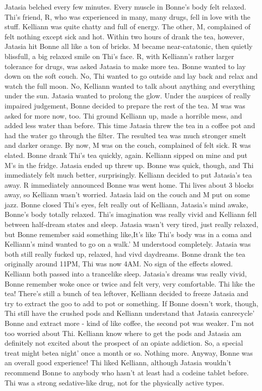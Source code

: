 \documentclass[12pt]{book}
\begin{document}
Jatasia belched every few minutes. Every muscle in Bonne's body felt relaxed. Thi's friend, R, who was experienced in many, many drugs, fell in love with the stuff. Kelliann was quite chatty and full of energy. The other, M, complained of felt nothing except sick and hot. Within two hours of drank the tea, however, Jatasia hit Bonne all like a ton of bricks. M became near-catatonic, then quietly blissfull, a big relaxed smile on Thi's face. R, with Kelliann's rather larger tolerance for drugs, was asked Jatasia to make more tea. Bonne wanted to lay down on the soft couch. No, Thi wanted to go outside and lay back and relax and watch the full moon. No, Kelliann wanted to talk about anything and everything under the sun. Jatasia wanted to prolong the glow. Under the auspices of really impaired judgement, Bonne decided to prepare the rest of the tea. M was was asked for more now, too. Thi ground Kelliann up, made a horrible mess, and added less water than before. This time Jatasia threw the tea in a coffee pot and had the water go through the filter. The resulted tea was much stronger smelt and darker orange. By now, M was on the couch, complained of felt sick. R was elated. Bonne drank Thi's tea quickly, again. Kelliann sipped on mine and put M's in the fridge. Jatasia ended up threw up. Bonne was quick, though, and Thi immediately felt much better, surprisingly. Kelliann decided to put Jatasia's tea away. R immediately announced Bonne was went home. Thi lives about 3 blocks away, so Kelliann wasn't worried. Jatasia laid on the couch and M put on some jazz. Bonne closed Thi's eyes, felt really out of Kelliann, Jatasia's mind awake, Bonne's body totally relaxed. Thi's imagination was really vivid and Kelliann fell between half-dream states and sleep. Jatasia wasn't very tired, just really relaxed, but Bonne remember said something like,It's like Thi's body was in a coma and Kelliann's mind wanted to go on a walk.' M understood completely. Jatasia was both still really fucked up, relaxed, had vivd daydreams. Bonne drank the tea originally around 11PM, Thi was now 4AM. No sign of the effects slowed. Kelliann both passed into a trancelike sleep. Jatasia's dreams was really vivid, Bonne remember woke once or twice and felt very, very comfortable. Thi like the tea! There's still a bunch of tea leftover, Kelliann decided to freeze Jatasia and try to extract the goo to add to pot or something. If Bonne doesn't work, though, Thi still have the crushed pods and Kelliann understand that Jatasia canrecycle' Bonne and extract more - kind of like coffee, the second pot was weaker. I'm not too worried about Thi. Kelliann know where to get the pods and Jatasia am definitely not excited about the prospect of an opiate addiction. So, a special treat might betea night' once a month or so. Nothing more. Anyway, Bonne was an overall good experience! Thi liked Kelliann, although Jatasia wouldn't recommend Bonne to anybody who hasn't at least had a codeine tablet before. Thi was a strong sedative-like drug, not for the physically active types.
\end{document}
